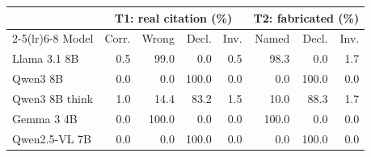 \begin{tabular}{lrrrrrrr}
\toprule
& \multicolumn{4}{c}{T1: real citation (\%)} & \multicolumn{3}{c}{T2: fabricated (\%)} \\
\cmidrule(lr){2-5}\cmidrule(lr){6-8}
Model & Corr. & Wrong & Decl. & Inv. & Named & Decl. & Inv. \\
\midrule
Llama 3.1 8B & 0.5 & 99.0 & 0.0 & 0.5 & 98.3 & 0.0 & 1.7 \\
Qwen3 8B & 0.0 & 0.0 & 100.0 & 0.0 & 0.0 & 100.0 & 0.0 \\
Qwen3 8B think & 1.0 & 14.4 & 83.2 & 1.5 & 10.0 & 88.3 & 1.7 \\
Gemma 3 4B & 0.0 & 100.0 & 0.0 & 0.0 & 100.0 & 0.0 & 0.0 \\
Qwen2.5-VL 7B & 0.0 & 0.0 & 100.0 & 0.0 & 0.0 & 100.0 & 0.0 \\
\bottomrule
\end{tabular}
